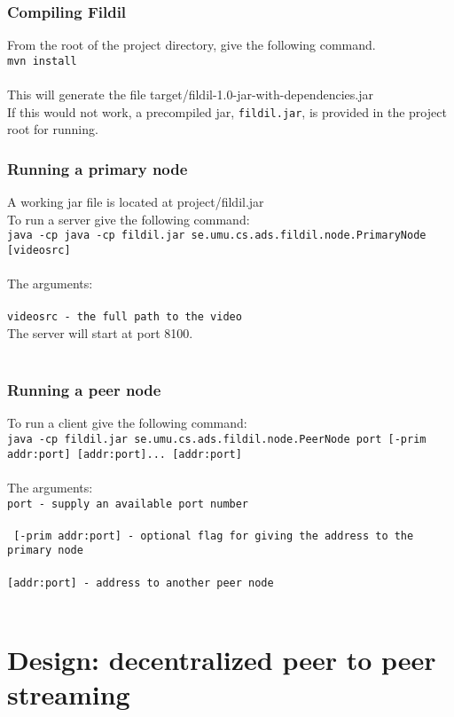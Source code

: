 \documentclass[10pt, a4paper]{article}
\begin{document}
\subsubsection{Compiling Fildil}
From the root of the project directory, give the following command.\\
\texttt{mvn install}\\
\\
This will generate the file target/fildil-1.0-jar-with-dependencies.jar\\
If this would not work, a precompiled jar, \texttt{fildil.jar}, is provided in
the project root for running.

\subsubsection{Running a primary node}
A working jar file is located at project/fildil.jar \\
To run a server give the following command:\\
\texttt{java -cp java -cp fildil.jar se.umu.cs.ads.fildil.node.PrimaryNode [videosrc]}\\
\\
The arguments:\\
\\
\texttt{videosrc - the full path to the video}\\
The server will start at port 8100. \\
\\
\subsubsection{Running a peer node}
To run a client give the following command:\\
\texttt{java -cp fildil.jar se.umu.cs.ads.fildil.node.PeerNode port [-prim addr:port] [addr:port]... [addr:port]}\\
\\
The arguments:\\
\texttt{port - supply an available port number}\\
\\
\texttt{ [-prim addr:port] - optional flag for giving the address to the primary node}\\
\\
\texttt{[addr:port] - address to another peer node}\\
\\

\section{Design: decentralized peer to peer streaming}
\label{sec:design}
\end{document}
